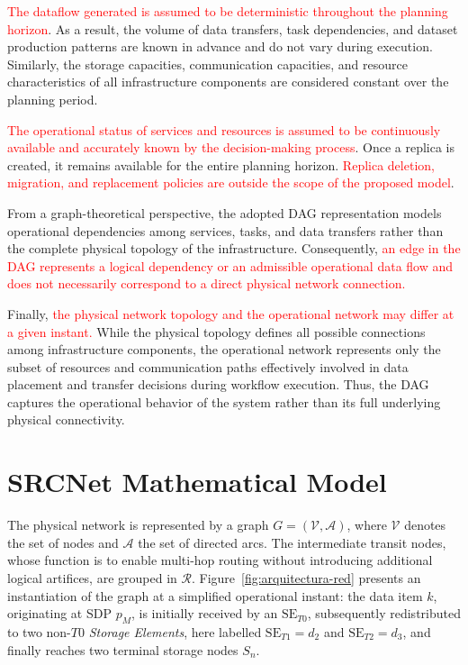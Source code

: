 \documentclass[a4paper,fleqn]{cas-dc}
\newcommand{\V}{\mathcal{V}}
\newcommand{\A}{\mathcal{A}}
\newcommand{\Rset}{\mathcal{R}}
\begin{document}
\textcolor{red}{The dataflow generated is assumed to be deterministic throughout the planning horizon}. As a result, the volume of data transfers, task dependencies, and dataset production patterns are known in advance and do not vary during execution. Similarly, the storage capacities, communication capacities, and resource characteristics of all infrastructure components are considered constant over the planning period.

\textcolor{red}{The operational status of services and resources is assumed to be continuously available and accurately known by the decision-making process}. Once a replica is created, it remains available for the entire planning horizon. \textcolor{red}{Replica deletion, migration, and replacement policies are outside the scope of the proposed model}.

From a graph-theoretical perspective, the adopted DAG representation models operational dependencies among services, tasks, and data transfers rather than the complete physical topology of the infrastructure. Consequently, \textcolor{red}{an edge in the DAG represents a logical dependency or an admissible operational data flow and does not necessarily correspond to a direct physical network connection.}

Finally, \textcolor{red}{the physical network topology and the operational network may differ at a given instant.} While the physical topology defines all possible connections among infrastructure components, the operational network represents only the subset of resources and communication paths effectively involved in data placement and transfer decisions during workflow execution. Thus, the DAG captures the operational behavior of the system rather than its full underlying physical connectivity.




\section{SRCNet Mathematical Model}
\label{Mathematical Model}

The physical network is represented by a graph \(G=(\V,\A)\), where \(\V\) denotes the set of nodes and \(\A\) the set of directed arcs. The intermediate transit nodes, whose function is to enable multi-hop routing without introducing additional logical artifices, are grouped in \(\Rset\). Figure~\ref{fig:arquitectura-red} presents an instantiation of the graph at a simplified operational instant: the data item \(k\), originating at SDP \(p_M\), is initially received by an \(\mathrm{SE}_{T0}\), subsequently redistributed to two non-\(T0\) \emph{Storage Elements}, here labelled \(\mathrm{SE}_{T1}=d_2\) and \(\mathrm{SE}_{T2}=d_3\), and finally reaches two terminal storage nodes \(S_n\). 
\end{document}
